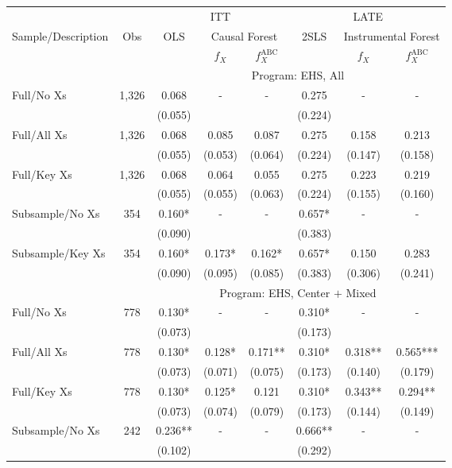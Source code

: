 \begin{tabular}{lccccccc}
\toprule 
\midrule 
\multicolumn{2}{c}{} & \multicolumn{3}{c}{ITT} & \multicolumn{3}{c}{LATE} \\
 \cmidrule(lr){3-5} \cmidrule(lr){6-8} 
Sample/Description & Obs & OLS & \multicolumn{2}{c}{Causal Forest} & 2SLS & \multicolumn{2}{c}{Instrumental Forest} \\
\multicolumn{3}{c}{} & $f_X$ & $f_X^{\text{ABC}}$ &  & $f_X$ & $f_X^{\text{ABC}}$ \\
\midrule 
 &  & \multicolumn{6}{c}{Program: EHS, All} \\
 \cmidrule(lr){3-8} 
Full/No Xs & 1,326 & 0.068 & - & - & 0.275 & - & - \\
 &  & (0.055) &  &  & (0.224) &  &  \\
Full/All Xs & 1,326 & 0.068 & 0.085 & 0.087 & 0.275 & 0.158 & 0.213 \\
 &  & (0.055) & (0.053) & (0.064) & (0.224) & (0.147) & (0.158) \\
Full/Key Xs & 1,326 & 0.068 & 0.064 & 0.055 & 0.275 & 0.223 & 0.219 \\
 &  & (0.055) & (0.055) & (0.063) & (0.224) & (0.155) & (0.160) \\
Subsample/No Xs & 354 & 0.160* & - & - & 0.657* & - & - \\
 &  & (0.090) &  &  & (0.383) &  &  \\
Subsample/Key Xs & 354 & 0.160* & 0.173* & 0.162* & 0.657* & 0.150 & 0.283 \\
 &  & (0.090) & (0.095) & (0.085) & (0.383) & (0.306) & (0.241) \\
\midrule 
 &  & \multicolumn{6}{c}{Program: EHS, Center $+$ Mixed} \\
 \cmidrule(lr){3-8} 
Full/No Xs & 778 & 0.130* & - & - & 0.310* & - & - \\
 &  & (0.073) &  &  & (0.173) &  &  \\
Full/All Xs & 778 & 0.130* & 0.128* & 0.171** & 0.310* & 0.318** & 0.565*** \\
 &  & (0.073) & (0.071) & (0.075) & (0.173) & (0.140) & (0.179) \\
Full/Key Xs & 778 & 0.130* & 0.125* & 0.121 & 0.310* & 0.343** & 0.294** \\
 &  & (0.073) & (0.074) & (0.079) & (0.173) & (0.144) & (0.149) \\
Subsample/No Xs & 242 & 0.236** & - & - & 0.666** & - & - \\
 &  & (0.102) &  &  & (0.292) &  &  \\

\end{tabular}
